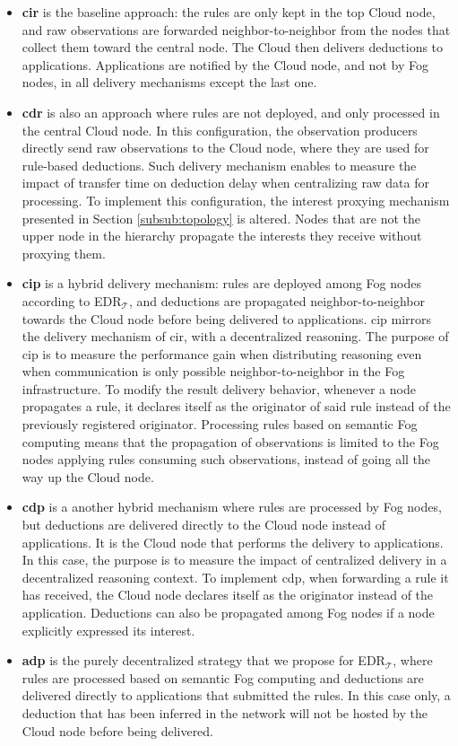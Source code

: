 \documentclass{iosart2c}
\newcommand{\edrt}{EDR$_{\mathcal{T}}$\xspace}
\begin{document}
\begin{itemize}
	\item \textbf{\gls{cir}} is the baseline approach: the rules are only kept in the top Cloud node, and raw observations are forwarded neighbor-to-neighbor from the nodes that collect them toward the central node. 
	The Cloud then delivers deductions to applications. 
	Applications are notified by the Cloud node, and not by Fog nodes, in all delivery mechanisms except the last one.
	
	\item \textbf{\gls{cdr}} is also an approach where rules are not deployed, and only processed in the central Cloud node. 
	In this configuration, the observation producers directly send raw observations to the Cloud node, where they are used for rule-based deductions.
	Such delivery mechanism enables to measure the impact of transfer time on deduction delay when centralizing raw data for processing.
	To implement this configuration, the interest proxying mechanism presented in Section \textsection \ref{subsub:topology} is altered. 
	Nodes that are not the upper node in the hierarchy propagate the interests they receive without proxying them.
	
	\item \textbf{\gls{cip}} is a hybrid delivery mechanism: rules are deployed among Fog nodes according to \edrt, and deductions are propagated neighbor-to-neighbor towards the Cloud node before being delivered to applications. 
	\gls{cip} mirrors the delivery mechanism of \gls{cir}, with a decentralized reasoning.
	The purpose of \gls{cip} is to measure the performance gain when distributing reasoning even when communication is only possible neighbor-to-neighbor in the Fog infrastructure.
	To modify the result delivery behavior, whenever a node propagates a rule, it declares itself as the originator of said rule instead of the previously registered originator.
	Processing rules based on semantic Fog computing means that the propagation of observations is limited to the Fog nodes applying rules consuming such observations, instead of going all the way up the Cloud node.
	
	\item \textbf{\gls{cdp}} is a another hybrid mechanism where rules are processed by Fog nodes, but deductions are delivered directly to the Cloud node instead of applications.
	It is the Cloud node that performs the delivery to applications.
	In this case, the purpose is to measure the impact of centralized delivery in a decentralized reasoning context.
	To implement \gls{cdp}, when forwarding a rule it has received, the Cloud node declares itself as the originator instead of the application.
	Deductions can also be propagated among Fog nodes if a node explicitly expressed its interest.
	
	\item \textbf{\gls{adp}} is the purely decentralized strategy that we propose for \edrt, where rules are processed based on semantic Fog computing and deductions are delivered directly to applications that submitted the rules. 
	In this case only, a deduction that has been inferred in the network will not be hosted by the Cloud node before being delivered.
\end{itemize}
\end{document}
